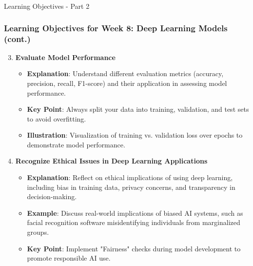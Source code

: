 \documentclass[aspectratio=169]{beamer}
\begin{document}
\begin{frame}[fragile]{Learning Objectives - Part 2}
    \frametitle{Learning Objectives for Week 8: Deep Learning Models (cont.)}
    
    \begin{enumerate}
        \setcounter{enumi}{2} %
        \item \textbf{Evaluate Model Performance}
        \begin{itemize}
            \item \textbf{Explanation}: Understand different evaluation metrics (accuracy, precision, recall, F1-score) and their application in assessing model performance.
            \item \textbf{Key Point}: Always split your data into training, validation, and test sets to avoid overfitting.
            \item \textbf{Illustration}: Visualization of training vs. validation loss over epochs to demonstrate model performance.
        \end{itemize}

        \item \textbf{Recognize Ethical Issues in Deep Learning Applications}
        \begin{itemize}
            \item \textbf{Explanation}: Reflect on ethical implications of using deep learning, including bias in training data, privacy concerns, and transparency in decision-making.
            \item \textbf{Example}: Discuss real-world implications of biased AI systems, such as facial recognition software misidentifying individuals from marginalized groups.
            \item \textbf{Key Point}: Implement "Fairness" checks during model development to promote responsible AI use.
        \end{itemize}
    \end{enumerate}
\end{frame}
\end{document}
